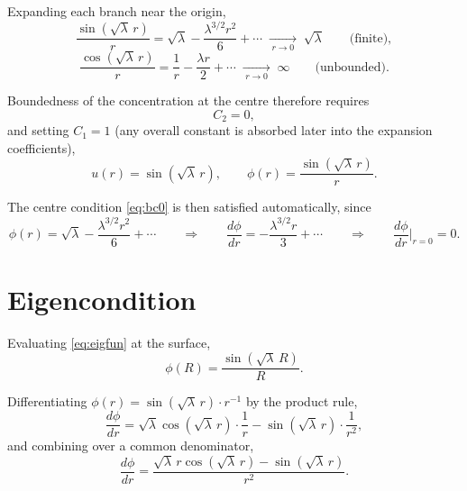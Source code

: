 \documentclass[11pt,a4paper]{article}
\begin{document}
Expanding each branch near the origin,
\begin{equation}
\frac{\sin\!\left(\sqrt{\lambda}\,r\right)}{r}
= \sqrt{\lambda} - \frac{\lambda^{3/2} r^{2}}{6} + \cdots
\;\xrightarrow[\;r \to 0\;]{}\;
\sqrt{\lambda}
\qquad \text{(finite)} ,
\end{equation}
\begin{equation}
\frac{\cos\!\left(\sqrt{\lambda}\,r\right)}{r}
= \frac{1}{r} - \frac{\lambda r}{2} + \cdots
\;\xrightarrow[\;r \to 0\;]{}\;
\infty
\qquad \text{(unbounded)} .
\end{equation}

Boundedness of the concentration at the centre therefore requires
\begin{equation}
C_{2} = 0 ,
\end{equation}
and setting $C_{1} = 1$ (any overall constant is absorbed later into the expansion
coefficients),
\begin{equation}
\boxed{\;
u(r) = \sin\!\left(\sqrt{\lambda}\,r\right) ,
\qquad
\phi(r) = \frac{\sin\!\left(\sqrt{\lambda}\,r\right)}{r} .
\;}
\label{eq:eigfun}
\end{equation}

The centre condition \eqref{eq:bc0} is then satisfied automatically, since
\begin{equation}
\phi(r) = \sqrt{\lambda} - \frac{\lambda^{3/2} r^{2}}{6} + \cdots
\qquad \Longrightarrow \qquad
\frac{d\phi}{dr} = -\frac{\lambda^{3/2} r}{3} + \cdots
\qquad \Longrightarrow \qquad
\frac{d\phi}{dr}\bigg|_{r=0} = 0 .
\end{equation}

\section{Eigencondition}

Evaluating \eqref{eq:eigfun} at the surface,
\begin{equation}
\phi(R) = \frac{\sin\!\left(\sqrt{\lambda}\,R\right)}{R} .
\end{equation}

Differentiating $\phi(r) = \sin\!\left(\sqrt{\lambda}\,r\right) \cdot r^{-1}$ by the
product rule,
\begin{equation}
\frac{d\phi}{dr}
= \sqrt{\lambda}\cos\!\left(\sqrt{\lambda}\,r\right)\cdot\frac{1}{r}
- \sin\!\left(\sqrt{\lambda}\,r\right)\cdot\frac{1}{r^{2}} ,
\end{equation}
and combining over a common denominator,
\begin{equation}
\frac{d\phi}{dr}
= \frac{\sqrt{\lambda}\,r\cos\!\left(\sqrt{\lambda}\,r\right)
- \sin\!\left(\sqrt{\lambda}\,r\right)}{r^{2}} .
\end{equation}
\end{document}
